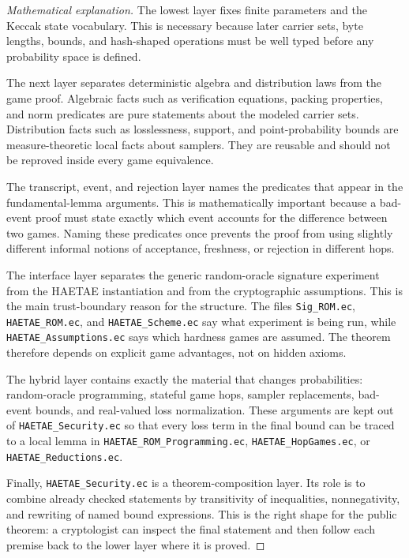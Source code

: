 \documentclass[11pt]{report}
\newcommand{\file}[1]{\nolinkurl{#1}}
\theoremstyle{definition}
\theoremstyle{plain}
\theoremstyle{definition}
\begin{document}
\begin{proof}[Mathematical explanation]
The lowest layer fixes finite parameters and the Keccak state vocabulary.  This
is necessary because later carrier sets, byte lengths, bounds, and hash-shaped
operations must be well typed before any probability space is defined.

The next layer separates deterministic algebra and distribution laws from the
game proof.  Algebraic facts such as verification equations, packing
properties, and norm predicates are pure statements about the modeled carrier
sets.  Distribution facts such as losslessness, support, and point-probability
bounds are measure-theoretic local facts about samplers.  They are reusable and
should not be reproved inside every game equivalence.

The transcript, event, and rejection layer names the predicates that appear in
the fundamental-lemma arguments.  This is mathematically important because a
bad-event proof must state exactly which event accounts for the difference
between two games.  Naming these predicates once prevents the proof from using
slightly different informal notions of acceptance, freshness, or rejection in
different hops.

The interface layer separates the generic random-oracle signature experiment
from the HAETAE instantiation and from the cryptographic assumptions.  This is
the main trust-boundary reason for the structure.  The files
\file{Sig\_ROM.ec}, \file{HAETAE\_ROM.ec}, and \file{HAETAE\_Scheme.ec} say
what experiment is being run, while \file{HAETAE\_Assumptions.ec} says which
hardness games are assumed.  The theorem therefore depends on explicit game
advantages, not on hidden axioms.

The hybrid layer contains exactly the material that changes probabilities:
random-oracle programming, stateful game hops, sampler replacements,
bad-event bounds, and real-valued loss normalization.  These arguments are
kept out of \file{HAETAE\_Security.ec} so that every loss term in the final
bound can be traced to a local lemma in \file{HAETAE\_ROM\_Programming.ec},
\file{HAETAE\_HopGames.ec}, or \file{HAETAE\_Reductions.ec}.

Finally, \file{HAETAE\_Security.ec} is a theorem-composition layer.  Its role
is to combine already checked statements by transitivity of inequalities,
nonnegativity, and rewriting of named bound expressions.  This is the right
shape for the public theorem: a cryptologist can inspect the final statement
and then follow each premise back to the lower layer where it is proved.
\end{proof}
\end{document}
